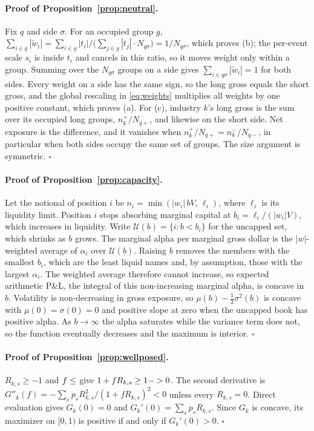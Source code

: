 \documentclass[11pt]{article}
\theoremstyle{definition}
\newcommand{\1}{\mathbf{1}}
\begin{document}
\paragraph{Proof of Proposition~\ref{prop:neutral}.}
Fix $q$ and side $\sigma$. For an occupied group $g$, $\sum_{i\in g}|\tilde w_i|=\sum_{i\in g}|t_i|\big/\big(\sum_{j\in g}|t_j|\cdot N_{q\sigma}\big)=1/N_{q\sigma}$, which proves (b); the per-event scale $s_i$ is inside $t_i$ and
cancels in this ratio, so it moves weight only within a group. Summing over the $N_{q\sigma}$ groups on a side gives $\sum_{i\in q\sigma}|\tilde w_i|=1$ for both sides. Every weight on a side has the same sign, so the long gross equals the short gross,
and the global rescaling in \eqref{eq:weights} multiplies all weights by one positive constant, which proves (a). For (c), industry $k$'s long gross is the sum over its occupied long groups, $n^+_k/N_{q+}$, and likewise on the short side.
Net exposure is the difference, and it vanishes when $n^{+}_{k}/N_{q+}=n^{-}_{k}/N_{q-}$, in particular when both sides occupy the same set of groups. The size argument is symmetric. $\square$

\paragraph{Proof of Proposition~\ref{prop:capacity}.}
Let the notional of position $i$ be $n_i=\min(|w_i|\,bV,\,\ell_i)$, where $\ell_i$ is its liquidity limit. Position $i$ stops absorbing marginal capital at $b_i=\ell_i/(|w_i|V)$, which increases in liquidity. Write
$\mathcal U(b)=\{i:b<b_i\}$ for the uncapped set, which shrinks as $b$ grows. The marginal alpha per marginal gross dollar is the $|w|$-weighted average of $\alpha_i$ over $\mathcal U(b)$. Raising $b$ removes the members with
the smallest $b_i$, which are the least liquid names and, by assumption, those with the largest $\alpha_i$. The weighted average therefore cannot increase, so expected arithmetic P\&L, the integral of this non-increasing
marginal alpha, is concave in $b$. Volatility is non-decreasing in gross exposure, so $\mu(b)-\tfrac12\sigma^2(b)$ is concave with $\mu(0)=\sigma(0)=0$ and positive slope at zero when the uncapped book has positive alpha.
As $b\to\infty$ the alpha saturates while the variance term does not, so the function eventually decreases and the maximum is interior. $\square$

\paragraph{Proof of Proposition~\ref{prop:wellposed}.}
$R_{k,s}\ge-1$ and $f\le\stv{kelly.fmax}$ give $1+fR_{k,s}\ge1-\stv{kelly.fmax}>0$. The second derivative is $G''_k(f)=-\sum_sp_sR_{k,s}^2/(1+fR_{k,s})^2<0$ unless every $R_{k,s}=0$. Direct evaluation gives
$G_k(0)=0$ and $G_k'(0)=\sum_sp_sR_{k,s}$. Since $G_k$ is concave, its maximizer on $[0,1)$ is positive if and only if $G_k'(0)>0$. $\square$
\end{document}
